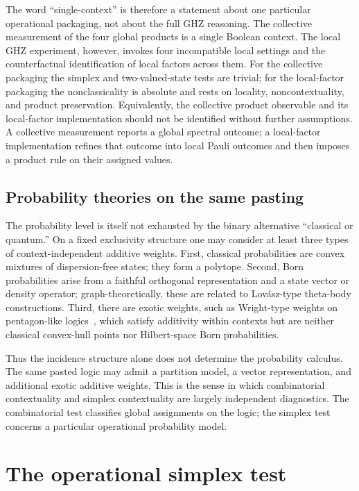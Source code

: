 \documentclass[aps,pra,twocolumn,superscriptaddress,nofootinbib]{revtex4-2}
\begin{document}
The word ``single-context'' is therefore a statement about one particular operational packaging, not about the full GHZ reasoning.  The collective measurement of the four global products is a single Boolean context.  The local GHZ experiment, however, invokes four incompatible local settings and the counterfactual identification of local factors across them.  For the collective packaging the simplex and two-valued-state tests are trivial; for the local-factor packaging the nonclassicality is absolute and rests on locality, noncontextuality, and product preservation.  Equivalently, the collective product observable and its local-factor implementation should not be identified without further assumptions.  A collective measurement reports a global spectral outcome; a local-factor implementation refines that outcome into local Pauli outcomes and then imposes a product rule on their assigned values.

\subsection{Probability theories on the same pasting}

The probability level is itself not exhausted by the binary alternative ``classical or quantum.''  On a fixed exclusivity structure one may consider at least three types of context-independent additive weights.  First, classical probabilities are convex mixtures of dispersion-free states; they form a polytope.  Second, Born probabilities arise from a faithful orthogonal representation and a state vector or density operator; graph-theoretically, these are related to Lov\'asz-type theta-body constructions.  Third, there are exotic weights, such as Wright-type weights on pentagon-like logics~\cite{greechie-1974,wright:pent}, which satisfy additivity within contexts but are neither classical convex-hull points nor Hilbert-space Born probabilities.

Thus the incidence structure alone does not determine the probability calculus.  The same pasted logic may admit a partition model, a vector representation, and additional exotic additive weights.  This is the sense in which combinatorial contextuality and simplex contextuality are largely independent diagnostics.  The combinatorial test classifies global assignments on the logic; the simplex test concerns a particular operational probability model.


\section{The operational simplex test}
\label{sec:simplex-test}
\end{document}
